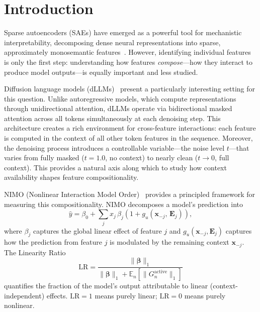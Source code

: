 \documentclass{article}
\newcommand{\LR}{\mathrm{LR}}
\newcommand{\bfx}{\mathbf{x}}
\newcommand{\bfbeta}{\boldsymbol{\beta}}
\begin{document}
\section{Introduction}

Sparse autoencoders (SAEs) have emerged as a powerful tool for mechanistic interpretability, decomposing dense neural representations into sparse, approximately monosemantic features~\citep{cunningham2023sparse,templeton2024scaling}.
However, identifying individual features is only the first step: understanding how features \emph{compose}---how they interact to produce model outputs---is equally important and less studied.

Diffusion language models (dLLMs)~\citep{llada2025,sahoo2024simple,lou2024discrete} present a particularly interesting setting for this question.
Unlike autoregressive models, which compute representations through unidirectional attention, dLLMs operate via bidirectional masked attention across all tokens simultaneously at each denoising step.
This architecture creates a rich environment for cross-feature interactions: each feature is computed in the context of all other token features in the sequence.
Moreover, the denoising process introduces a controllable variable---the noise level $t$---that varies from fully masked ($t = 1.0$, no context) to nearly clean ($t \to 0$, full context).
This provides a natural axis along which to study how context availability shapes feature compositionality.

NIMO (Nonlinear Interaction Model Order)~\citep{xu2026nimo} provides a principled framework for measuring this compositionality.
NIMO decomposes a model's prediction into
\begin{equation}
    \hat{y} = \beta_0 + \sum_j x_j\,\beta_j\!\left(1 + g_u(\bfx_{-j},\,\mathbf{E}_j)\right),
    \label{eq:nimo}
\end{equation}
where $\beta_j$ captures the global linear effect of feature $j$ and $g_u(\bfx_{-j}, \mathbf{E}_j)$ captures how the prediction from feature $j$ is modulated by the remaining context $\bfx_{-j}$.
The Linearity Ratio
\begin{equation}
    \LR = \frac{\|\bfbeta\|_1}{\|\bfbeta\|_1 + \mathbb{E}_n\!\left[\|G_n^{\mathrm{active}}\|_1\right]}
    \label{eq:lr}
\end{equation}
quantifies the fraction of the model's output attributable to linear (context-independent) effects. $\LR = 1$ means purely linear; $\LR = 0$ means purely nonlinear.
\end{document}
